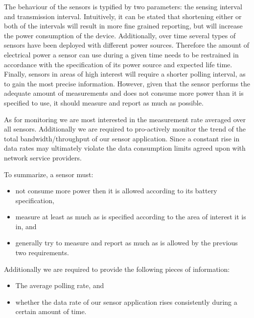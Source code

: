 The behaviour of the sensors is typified by two parameters: the sensing interval and transmission interval. Intuitively, it can be stated that shortening either or both of the intervals will result in more fine grained reporting, but will increase the power consumption of the device. Additionally, over time several types of sensors have been deployed with different power sources. Therefore the amount of electrical power a sensor can use during a given time needs to be restrained in accordance with the specification of its power source and expected life time. Finally, sensors in areas of high interest will require a shorter polling interval, as to gain the most precise information. However, given that the sensor performs the adequate amount of measurements and does not consume more power than it is specified to use, it should measure and report as much as possible.

As for monitoring we are most interested in the measurement rate averaged over all sensors. Additionally we are required to pro-actively monitor the trend of the total bandwidth/throughput of our sensor application. Since a constant rise in data rates may ultimately violate the data consumption limits agreed upon with network service providers.

To summarize, a sensor must:
\begin{itemize}
\nospace
\item not consume more power then it is allowed according to its battery specification,
\item measure at least as much as is specified according to the area of interest it is in, and
\item generally try to measure and report as much as is allowed by the previous two requirements.
\end{itemize}
Additionally we are required to provide the following pieces of information:
\begin{itemize}
\nospace
\item The average polling rate, and
\item whether the data rate of our sensor application rises consistently during a certain amount of time.
\end{itemize}

